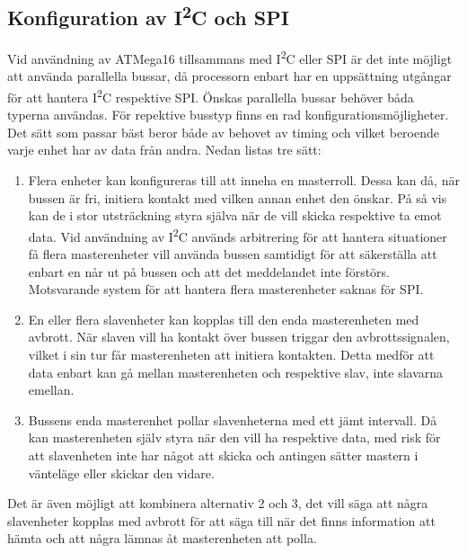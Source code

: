 \documentclass[11pt]{article}
\begin{document}
\begin{flushleft}
\subsection{Konfiguration av I\textsuperscript{2}C och SPI}

Vid användning av ATMega16 tillsammans med I\textsuperscript{2}C eller SPI är det inte möjligt att använda parallella bussar, då processorn enbart har en uppsättning utgångar för att hantera I\textsuperscript{2}C respektive SPI. Önskas parallella bussar behöver båda typerna användas. För repektive busstyp finns en rad konfigurationsmöjligheter. Det sätt som passar bäst beror både av behovet av timing och vilket beroende varje enhet har av data från andra. Nedan listas tre sätt:

\begin{enumerate}
 \item Flera enheter kan konfigureras till att inneha en masterroll. Dessa kan då, när bussen är fri, initiera kontakt med vilken annan enhet den önskar. På så vis kan de i stor utsträckning styra själva när de vill skicka respektive ta emot data. Vid användning av I\textsuperscript{2}C används arbitrering för att hantera situationer få flera masterenheter vill använda bussen samtidigt för att säkerställa att enbart en når ut på bussen och att det meddelandet inte förstörs. \cite{guideI2C} Motsvarande system för att hantera flera masterenheter saknas för SPI.
 
 \item En eller flera slavenheter kan kopplas till den enda masterenheten med avbrott. När slaven vill ha kontakt över bussen triggar den avbrottssignalen, vilket i sin tur får masterenheten att initiera kontakten. Detta medför att data enbart kan gå mellan masterenheten och respektive slav, inte slavarna emellan.
 
 \item Bussens enda masterenhet pollar slavenheterna med ett jämt intervall. Då kan masterenheten själv styra när den vill ha respektive  data, med risk för att slavenheten inte har något att skicka och antingen sätter mastern i vänteläge eller skickar den vidare.
\end{enumerate}

Det är även möjligt att kombinera alternativ 2 och 3, det vill säga att några slavenheter kopplas med avbrott för att säga till när det finns information att hämta och att några lämnas åt masterenheten att polla.


\end{flushleft}
\end{document}
